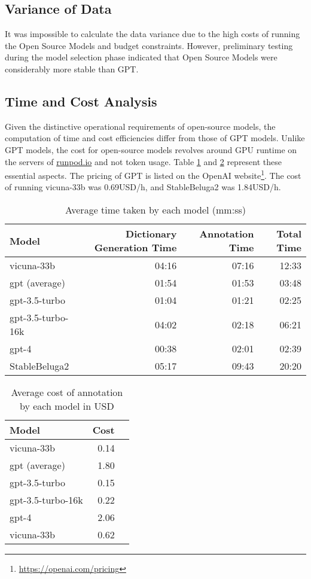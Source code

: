 \subsection{Variance of Data}
It was impossible to calculate the data variance due to the high costs of running the Open Source Models and budget constraints. However, preliminary testing during the model selection phase indicated that Open Source Models were considerably more stable than GPT.

\subsection{Time and Cost Analysis}
Given the distinctive operational requirements of open-source models, the computation of time and cost efficiencies differ from those of GPT models. Unlike GPT models, the cost for open-source models revolves around GPU runtime on the servers of \href{https://runpod.io}{runpod.io} and not token usage. Table \ref{tab:open-time} and \ref{tab:open-cost} represent these essential aspects. The pricing of GPT is listed on the OpenAI website\footnote{\url{https://openai.com/pricing}}. The cost of running vicuna-33b was 0.69USD/h, and StableBeluga2 was 1.84USD/h.

\begin{table}[htpb]
  \centering
  \begin{tabular}{lrrr}
    \hline
    Model & Dictionary Generation Time & Annotation Time & Total Time \\
    \hline
    vicuna-33b & 04:16 & 07:16 & 12:33 \\
    gpt (average) & 01:54 & 01:53 & 03:48 \\
    gpt-3.5-turbo & 01:04 & 01:21 & 02:25 \\
    gpt-3.5-turbo-16k & 04:02 & 02:18 & 06:21 \\
    gpt-4 & 00:38 & 02:01 & 02:39 \\
    StableBeluga2 & 05:17 & 09:43 & 20:20 \\
    \hline
  \end{tabular}
  \caption[Average time taken]{Average time taken by each model (mm:ss)}
  \label{tab:open-time}
\end{table}

\begin{table}[htpb]
  \centering
  \begin{tabular}{lrr}
    \hline
    Model & Cost \\
    \hline
    vicuna-33b & 0.14 \\
    gpt (average) & 1.80 \\
    gpt-3.5-turbo & 0.15 \\
    gpt-3.5-turbo-16k & 0.22 \\
    gpt-4 & 2.06 \\
    vicuna-33b & 0.62 \\
    \hline
  \end{tabular}
  \caption[Cost Analysis]{Average cost of annotation by each model in USD}
  \label{tab:open-cost}
\end{table}